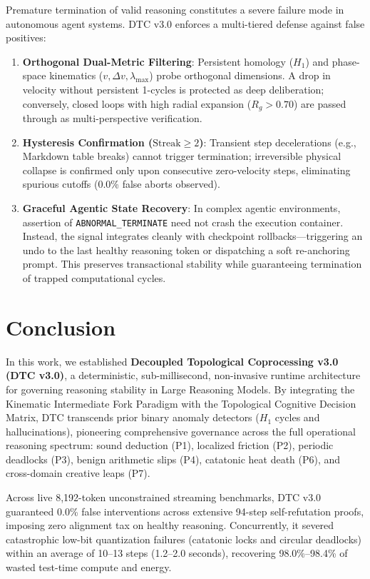 \documentclass[11pt,a4paper]{article}
\begin{document}
Premature termination of valid reasoning constitutes a severe failure mode in autonomous agent systems. DTC v3.0 enforces a multi-tiered defense against false positives:
\begin{enumerate}
    \item \textbf{Orthogonal Dual-Metric Filtering}: Persistent homology ($H_1$) and phase-space kinematics ($v, \Delta v, \lambda_{\max}$) probe orthogonal dimensions. A drop in velocity without persistent 1-cycles is protected as deep deliberation; conversely, closed loops with high radial expansion ($R_g > 0.70$) are passed through as multi-perspective verification.
    \item \textbf{Hysteresis Confirmation ($\text{Streak} \ge 2$)}: Transient step decelerations (e.g., Markdown table breaks) cannot trigger termination; irreversible physical collapse is confirmed only upon consecutive zero-velocity steps, eliminating spurious cutoffs (0.0\% false aborts observed).
    \item \textbf{Graceful Agentic State Recovery}: In complex agentic environments, assertion of \texttt{ABNORMAL\_TERMINATE} need not crash the execution container. Instead, the signal integrates cleanly with checkpoint rollbacks---triggering an undo to the last healthy reasoning token or dispatching a soft re-anchoring prompt. This preserves transactional stability while guaranteeing termination of trapped computational cycles.
\end{enumerate}

\section{Conclusion}

In this work, we established \textbf{Decoupled Topological Coprocessing v3.0 (DTC v3.0)}, a deterministic, sub-millisecond, non-invasive runtime architecture for governing reasoning stability in Large Reasoning Models. By integrating the Kinematic Intermediate Fork Paradigm with the Topological Cognitive Decision Matrix, DTC transcends prior binary anomaly detectors ($H_1$ cycles and hallucinations), pioneering comprehensive governance across the full operational reasoning spectrum: sound deduction (P1), localized friction (P2), periodic deadlocks (P3), benign arithmetic slips (P4), catatonic heat death (P6), and cross-domain creative leaps (P7).

Across live 8,192-token unconstrained streaming benchmarks, DTC v3.0 guaranteed 0.0\% false interventions across extensive 94-step self-refutation proofs, imposing zero alignment tax on healthy reasoning. Concurrently, it severed catastrophic low-bit quantization failures (catatonic locks and circular deadlocks) within an average of 10--13 steps (1.2--2.0 seconds), recovering 98.0\%--98.4\% of wasted test-time compute and energy.
\end{document}

